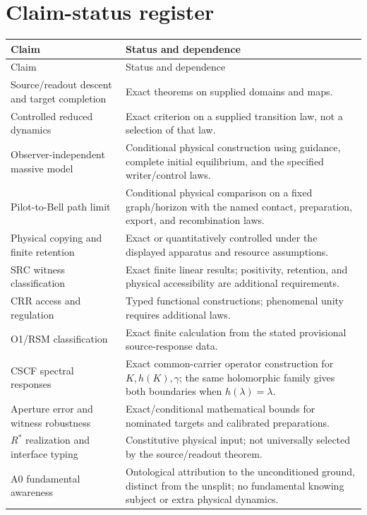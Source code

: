 \section{Claim-status register}\label{section:ledger:claim-status-register}
\begin{longtable}{@{}p{}p{}@{}}
\toprule Claim & Status and dependence\\\midrule\endfirsthead
\toprule Claim & Status and dependence\\\midrule\endhead
Source/readout descent and target completion & Exact theorems on supplied domains and maps.\\
Controlled reduced dynamics & Exact criterion on a supplied transition law, not a selection of that law.\\
Observer-independent massive model & Conditional physical construction using guidance, complete initial equilibrium, and the specified writer/control laws.\\
Pilot-to-Bell path limit & Conditional physical comparison on a fixed graph/horizon with the named contact, preparation, export, and recombination laws.\\
Physical copying and finite retention & Exact or quantitatively controlled under the displayed apparatus and resource assumptions.\\
SRC witness classification & Exact finite linear results; positivity, retention, and physical accessibility are additional requirements.\\
CRR access and regulation & Typed functional constructions; phenomenal unity requires additional laws.\\
O1/RSM classification & Exact finite calculation from the stated provisional source-response data.\\
CSCF spectral responses & Exact common-carrier operator construction for $K,h(K),\gamma$; the same holomorphic family gives both boundaries when $h(\lambda)=\lambda$.\\
Aperture error and witness robustness & Exact/conditional mathematical bounds for nominated targets and calibrated preparations.\\
$R^\ast$ realization and interface typing & Constitutive physical input; not universally selected by the source/readout theorem.\\
A0 fundamental awareness & Ontological attribution to the unconditioned ground, distinct from the unsplit; no fundamental knowing subject or extra physical dynamics.\\

\end{longtable}
